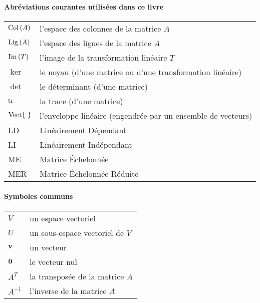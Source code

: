 %
%



  

\paragraph{Abréviations courantes utilisées dans ce livre}

\begin{tabular}{ll}
	$\col(A)$ & {l'espace des colonnes de la matrice $A$} \\
	$\row(A)$ & {l'espace des lignes de la matrice $A$} \\
	$\im(T)$ & {l'image de la transformation linéaire $T$} \\
	$\ker$&  {le noyau (d'une matrice ou d'une transformation linéaire)} \\
	$\det$& {le d\'eterminant (d'une matrice)} \\
	$\tr$& {la trace (d'une matrice)} \\
	$\sp~$& {l'enveloppe lin\'eaire (engendr\'ee par un ensemble de vecteurs)} \\
	LD& {Linéairement Dépendant} \\
	LI&{Linéairement Indépendant} \\
	ME&{Matrice \'Echelonn\'ee } \\
	MER&{Matrice \'Echelonn\'ee R\'eduite}
\end{tabular}

\paragraph{Symboles communs}

\begin{tabular}{ll}
	$V$ &{un espace vectoriel} \\
	$U$ & {un sous-espace vectoriel de $V$} \\
	$\vv$& {un vecteur} \\
	$\zero$& {le vecteur nul} \\
	$A^T$& {la transpos\'ee de la matrice $A$} \\
	$A^{-1}$& {l'inverse de la matrice $A$}
\end{tabular}
